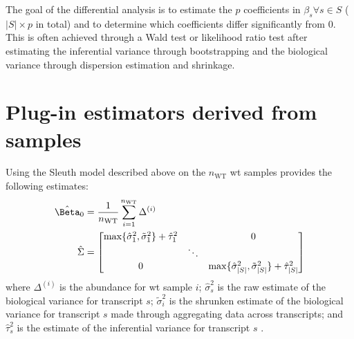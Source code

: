 The goal of the differential analysis is to estimate the $p$ coefficients in $\beta_s \forall s \in S$ ($|S| \times p$ in total) and to determine which coefficients differ significantly from 0.
This is often achieved through a Wald test or likelihood ratio test after estimating the inferential variance through bootstrapping and the biological variance through dispersion estimation and shrinkage.

\section{Plug-in estimators derived from  samples}

Using the Sleuth model described above on the $n_\mathrm{WT}$ \gls{wt} samples provides the following estimates:
%
\begin{align}
  \hat{\Beta}_0 & = \frac{1}{n_\mathrm{WT}} \sum_{i = 1}^{n_\mathrm{WT}} \Delta^{(i)} \\
  \hat{\Sigma}  & = \begin{bmatrix}
    \max\{\hat{\sigma}_1^2, \tilde{\sigma}_1^2\} + \hat{\tau}_1^2 &        & 0                                                                         \\
                                                                  & \ddots                                                                             \\
    0                                                             &        & \max\{\hat{\sigma}_{|S|}^2, \tilde{\sigma}_{|S|}^2\} + \hat{\tau}_{|S|}^2 \\
  \end{bmatrix}
\end{align}
%
where $\Delta^{(i)}$ is the abundance for \gls{wt} sample $i$; $\hat{\sigma}_s^2$ is the raw estimate of the biological variance for transcript $s$; $\tilde{\sigma}_i^2$ is the shrunken estimate of the biological variance for transcript $s$ made through aggregating data across transcripts; and $\hat{\tau}_s^2$ is the estimate of the inferential variance for transcript $s$ \cite{pimentelDifferentialAnalysisRNAseq2017}.

